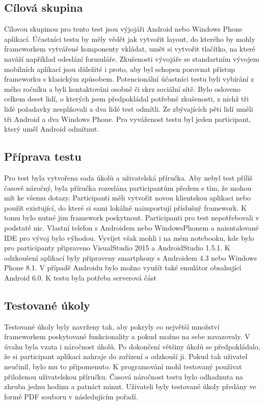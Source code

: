 \subsection{Cílová skupina}
Cílovou skupinou pro tento test jsou výjojáři Android nebo Windows Phone aplikací. Účastníci testu by měly vědět jak vytvořit layout, do kterého by mohly frameworkem vytvářené komponenty vkládat, umět si vytvořit tlačítko, na které naváží například odeslání formuláře. Zkušenosti vývojáře se standartním vývojem mobilních aplikací jsou důležité i proto, aby byl schopen porovnat přístup frameworku s klasickým způsobem. Potencionální účastníci testu byli vybírání z mého ročníku a byli kontaktováni osobně či skrz sociální sítě. Bylo osloveno celkem deset lidí, o kterých jsem předpokládal potřebné zkušenosti, z nichž tři lidé požadavky nesplňovali a dva lidé test odmítli. Ze zbývajících pěti lidí uměli tři Android a dva Windows Phone. Pro vyváženost testu byl jeden participant, který uměl Android odmítnut.    

\subsection{Příprava testu}	
Pro test byla vytvořena sada úkolů a uživatelská příručka. Aby nebyl test příliš časově náročný, byla příručka rozeslána participantům předem s tím, že mohou mít ke všemu dotazy. Participanti měli vytvořit novou klientskou aplikaci nebo použít existující, do které si sami lokálně naimportují příslušný framework. K tomu bylo nutné jim framework poskytnout. Participanti pro test nepotřebovali v podstatě nic. Vlastní telefon s Androidem nebo WindowsPhonem a naisntalované IDE pro vývoj bylo výhodou. Vyvíjet však mohli i na mém notebooku, kde bylo pro participanty připraveno VisualStudio 2015 a AndroidStudio 1.5.1. K odzkoušení aplikací byly připraveny smartphony s Androidem 4.3 nebo Windows Phone 8.1. V případě Androidu bylo možno využít také emulátor obsahující Android 6.0. K testu byla potřeba serverová část
 
\subsection{Testované úkoly}
Testované úkoly byly navrženy tak, aby pokryly co největší množství frameworkem poskytované funkcionality a pokud možno na sebe navazovaly. V úvahu byla vzata i náročnost úkolů. Po dokončení většiny úkolů se předpokládalo, že si participant aplikaci nahraje do zařízení a odzkouší ji. Pokud tak uživatel neučinil, bylo mu to připomenuto. K programování mohl testovaný používat přiloženou uživatelskou příručku. Časová náročnost testu bylo odhadnuta na zhruba jednu hodinu a patnáct minut. Uživateli byly testované úkoly předány ve formě PDF souboru v následujícím pořadí.

